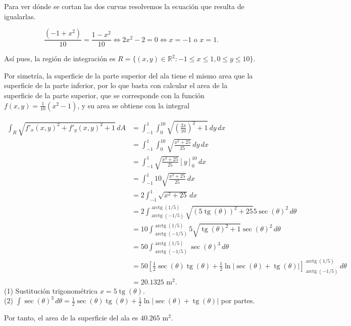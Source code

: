 \documentclass[
  spanish,
  a4paper,
]{scrreport}
\theoremstyle{definition}
\theoremstyle{remark}
\begin{document}
\begin{tcolorbox}[enhanced jigsaw, arc=.35mm, bottomrule=.15mm, bottomtitle=1mm, breakable, colback=white, colbacktitle=quarto-callout-tip-color!10!white, colframe=quarto-callout-tip-color-frame, coltitle=black, left=2mm, leftrule=.75mm, opacityback=0, opacitybacktitle=0.6, rightrule=.15mm, title=\textcolor{quarto-callout-tip-color}{\faLightbulb}\hspace{0.5em}{Solución}, titlerule=0mm, toprule=.15mm, toptitle=1mm]

Para ver dónde se cortan las dos curvas resolvemos la ecuación que
resulta de igualarlas.

\[
\frac{(-1+x^2)}{10} = \frac{1-x^2}{10} \Leftrightarrow 2x^2 - 2 = 0 \Leftrightarrow x=-1 \mbox{ o } x=1.
\]

Así pues, la región de integración es
\(R=\{(x,y)\in \mathbb{R}^2: -1\leq x\leq 1, 0\leq y\leq 10\}\).

Por simetría, la superficie de la parte superior del ala tiene el mismo
area que la superficie de la parte inferior, por lo que basta con
calcular el area de la superficie de la parte superior, que se
corresponde con la función \(f(x,y)=\frac{1}{10}(x^2-1)\), y su area se
obtiene con la integral

\begin{align*}
\int_R \sqrt{f'_x(x,y)^2+f'_y(x,y)^2+1}\,dA
&= \int_{-1}^1\int_0^10 \sqrt{\left(\frac{2x}{10}\right)^2+1}\,dy\,dx \\
&= \int_{-1}^1\int_0^10 \sqrt{\frac{x^2+25}{25}}\,dy\,dx \\
&= \int_{-1}^1 \sqrt{\frac{x^2+25}{25}} [y]_0^10\,dx \\
&= \int_{-1}^1 10 \sqrt{\frac{x^2+25}{25}} \,dx \\
&= 2\int_{-1}^1 \sqrt{x^2+25} \,dx \\
&= 2\int_{\operatorname{arctg}(-1/5)}^{\operatorname{arctg}(1/5)} \sqrt{(5\operatorname{tg}(\theta))^2+25} 5\sec(\theta)^2\,d\theta \tag{1}\\
&= 10\int_{\operatorname{arctg}(-1/5)}^{\operatorname{arctg}(1/5)} 5\sqrt{\operatorname{tg}(\theta)^2+1}\sec(\theta)^2\,d\theta \\
&= 50\int_{\operatorname{arctg}(-1/5)}^{\operatorname{arctg}(1/5)} \sec(\theta)^3\,d\theta \tag{2} \\
&= 50\left[ \frac{1}{2}\sec(\theta)\operatorname{tg}(\theta) + \frac{1}{2} \ln|\sec(\theta)+\operatorname{tg}(\theta)|\right]_{\operatorname{arctg}(-1/5)}^{\operatorname{arctg}(1/5)}\,d\theta \\
&= 20.1325 \mbox{ m}^2.
\end{align*} (1) Sustitución trigonométrica
\(x= 5\operatorname{tg}(\theta)\).\\
(2)
\(\int \sec(\theta)^3\,d\theta = \frac{1}{2}\sec(\theta)\operatorname{tg}(\theta) + \frac{1}{2} \ln|\sec(\theta)+\operatorname{tg}(\theta)|\)
por partes.

Por tanto, el area de la superficie del ala es \(40.265\) m\(^2\).

\end{tcolorbox}
\end{document}
